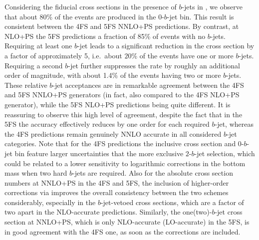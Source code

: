 \documentclass[11pt,a4paper]{article}
\begin{document}
Considering the fiducial cross sections in the presence of $b$-jets in , we observe that about 80\% of the events 
are produced in the $0$-$b$-jet bin. This result is consistent between the 4FS and 5FS NNLO+PS predictions. By contrast, at NLO+PS 
the 5FS predictions a fraction of 85\% of events with no $b$-jets. Requiring at least one $b$-jet leads to a significant reduction in the cross section by a factor 
of approximately 5, i.e.\ about $20$\% of the events have one or more $b$-jets. Requiring a second $b$-jet further suppresses the rate by roughly 
an additional order of magnitude, with about 1.4\% of the \bbH{} events having two or more $b$-jets.
These relative $b$-jet acceptances are in remarkable agreement between the 4FS and 5FS NNLO+PS generators (in fact, also
compared to the 4FS NLO+PS generator), while
the 5FS NLO+PS predictions being quite different. It is reassuring to observe this high level of agreement, despite the fact that 
in the 5FS the accuracy effectively reduces by one order for each required $b$-jet, whereas the 4FS predictions remain genuinely 
NNLO accurate in all considered $b$-jet categories.
Note that for the \minnlo{} 4FS predictions the inclusive cross section 
and $0$-$b$-jet bin feature larger uncertainties that the more exclusive $2$-$b$-jet selection,
which could be related to a lower sensitivity to logarithmic corrections in the bottom mass
when two hard $b$-jets are required.
Also for the absolute cross section numbers at NNLO+PS in the 4FS and 5FS, the inclusion of higher-order corrections 
via \minnlo{} improves the overall consistency between the two schemes considerably, especially in the $b$-jet-vetoed cross sections,
which are a factor of two apart in the NLO-accurate predictions. Similarly, the one(two)-$b$-jet cross section at NNLO+PS, which is only NLO-accurate (LO-accurate) in the 5FS, 
is in good agreement with the 4FS one, as soon as the \minnlo{} corrections are included.
\end{document}
